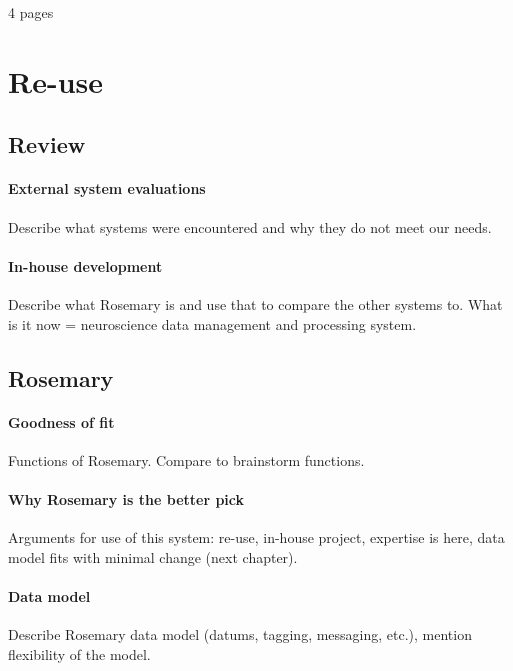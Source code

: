 \newline

4 pages

\section{Re-use}

\subsection{Review}
\paragraph{External system evaluations}
Describe what systems were encountered and why they do not meet our needs.
\paragraph{In-house development}
Describe what Rosemary is and use that to compare the other systems to.
What is it now = neuroscience data management and processing system.

\subsection{Rosemary}
\paragraph{Goodness of fit}
Functions of Rosemary.
Compare to brainstorm functions.
\paragraph{Why Rosemary is the better pick}
Arguments for use of this system: re-use, in-house project, expertise is here, data model fits with minimal change (next chapter).
\paragraph{Data model}
Describe Rosemary data model (datums, tagging, messaging, etc.), mention flexibility of the model.